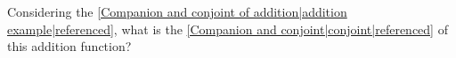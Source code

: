 
Considering the \ref{Companion and conjoint of addition|addition example|referenced}, what is the \ref{Companion and conjoint|conjoint|referenced} of this addition function?